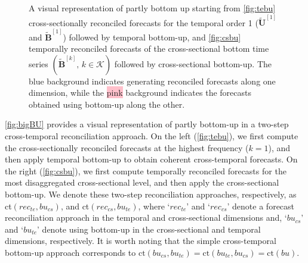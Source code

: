 \documentclass[a4paper,11pt]{article}
\newcommand{\Bvet}{\bm{B}}
\newcommand{\Uvet}{\bm{U}}
\theoremstyle{definition}
\begin{document}
\begin{figure}[!t]
\begin{subfigure}[b]{0.49\textwidth}
{}
		\label{fig:csbu}
	\end{subfigure}
	\vspace{-0.25cm}
	\caption{A visual representation of partly bottom up starting from \eqref{fig:tebu} cross-sectionally reconciled forecasts for the temporal order 1 ($\widetilde{\Uvet}^{[1]}$ and $\widetilde{\Bvet}^{[1]}$) followed by temporal bottom-up, and \eqref{fig:csbu} temporally reconciled forecasts of the cross-sectional bottom time series $(\widetilde{\Bvet}^{[k]}, \, k\in \mathcal{K})$ followed by cross-sectional bottom-up. The \colorbox{mybluehl}{blue} background indicates generating reconciled forecasts along one dimension, while the \colorbox{pink}{pink} background indicates the forecasts obtained using bottom-up along the other.
		}
	\label{fig:bigBU}
	\vspace*{-0.5\baselineskip}
\end{figure}

\autoref{fig:bigBU} provides a visual representation of partly bottom-up in a two-step cross-temporal reconciliation approach. On the left (\autoref{fig:tebu}), we first compute the cross-sectionally reconciled forecasts at the highest frequency ($k = 1$), and then apply temporal bottom-up to obtain coherent cross-temporal forecasts. On the right (\autoref{fig:csbu}), we first compute temporally reconciled forecasts for the most disaggregated cross-sectional level, and then apply the cross-sectional bottom-up. We denote these two-step reconciliation approaches, respectively, as ct$(rec_{te},bu_{cs})$, and ct$(rec_{cs},bu_{te})$, where ‘$rec_{te}$’ and ‘$rec_{cs}$’ denote a forecast reconciliation approach in the temporal and cross-sectional dimensions and, ‘$bu_{cs}$’ and ‘$bu_{te}$’ denote using bottom-up in the cross-sectional and temporal dimensions, respectively. It is worth noting that the simple cross-temporal bottom-up approach corresponds to $\mathrm{ct}(bu_{cs}, bu_{te})=\mathrm{ct}(bu_{te}, bu_{cs})=\mathrm{ct}(bu)$.
\end{document}
